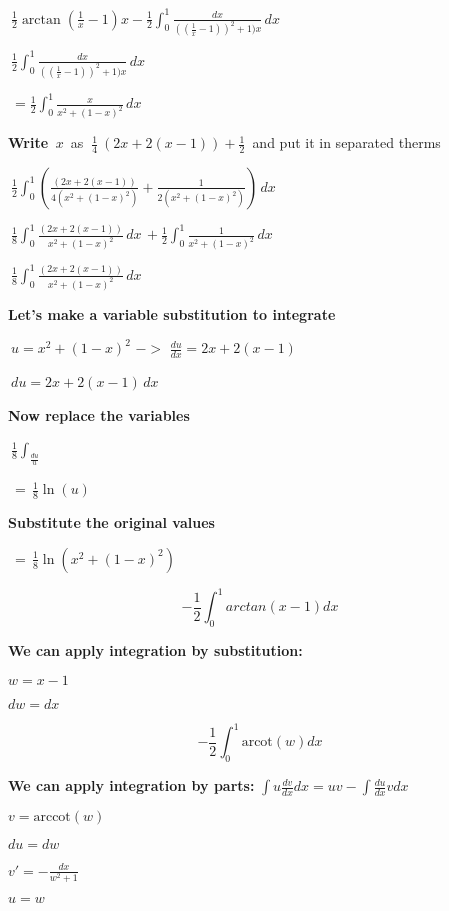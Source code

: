 \documentclass{article}
\begin{document}
\bigskip $\ \frac{1}{2} \arctan{(\frac{1}{x}-1)}x-\frac{1}{2} \int_{0}^{1} \frac{dx}{((\frac{1}{x}-1))^2+1)x} \,dx \, $\

\bigskip $\ \frac{1}{2} \int_{0}^{1} \frac{dx}{((\frac{1}{x}-1))^2+1)x} \,dx \, $\ 


\newpage

\bigskip $\ = \frac{1}{2} \int_{0}^{1} \frac{x}{x^2+(1-x)^2} \,dx \, $\ 

\bigskip \textbf{Write} $\ x $\ {as} $\ \frac{1}{4} \ (2x+2(x-1))+ \frac{1}{2} $\ {and put it in separated therms} 

\bigskip $\ \frac{1}{2} \int_{0}^{1} (\frac{(2x+2(x-1))}{4(x^2+(1-x)^2)} + \frac{1}{2(x^2+(1-x)^2)}) \,dx \,$\ 

\bigskip $\ \frac{1}{8} \int_{0}^{1} \frac{(2x+2(x-1))}{x^2+(1-x)^2}\,dx\, + \frac{1}{2} \int_{0}^{1}\frac{1}{x^2+(1-x)^2} \,dx \,$\ 

\bigskip

\bigskip $\ \frac{1}{8} \int_{0}^{1} \frac{(2x+2(x-1))}{x^2+(1-x)^2}\,dx\,$\ 

\bigskip \textbf{Let's make a variable substitution to integrate} 

\bigskip $\ u=x^2+(1-x)^2 \,\,->\,\, \frac {du}{dx}= 2x+2(x-1) \,\,$\ 

\bigskip $\ du=2x+2(x-1) \,dx\,$\

\bigskip \textbf{Now replace the variables} 

\bigskip $\ \frac{1}{8} \int_ \frac {du}{u} $\

\bigskip $\ = \, \frac{1}{8} \ln (u) $\

\bigskip \textbf{Substitute the original values}

\bigskip $\ = \, \frac{1}{8} \ln (x^2+(1-x)^2)  $


\begin{equation*}
   -\frac{1}{2}\int_{0}^{1} arctan(x-1)dx
\end{equation*}

\bigskip\textbf{We can apply integration by substitution:}
\begin{list}{}{}
       \item $w=x-1$  
       \item $dw=dx$
\end{list}

\begin{equation*}
   -\frac{1}{2}\int_{0}^{1}\textrm{arcot}(w)dx
\end{equation*}

\bigskip\textbf{We can apply integration by parts:} $\int {u\frac{{dv}}{{dx}}} dx = uv - \int {\frac{{du}}{{dx}}} vdx$ 
\begin{list}{}{}
       \item $v=\textrm{arccot}(w)$
       \item $du = dw$
       \item $v'=-\frac{dx}{w^2+1}
$
       \item $u=w$
\end{list}
\end{document}
